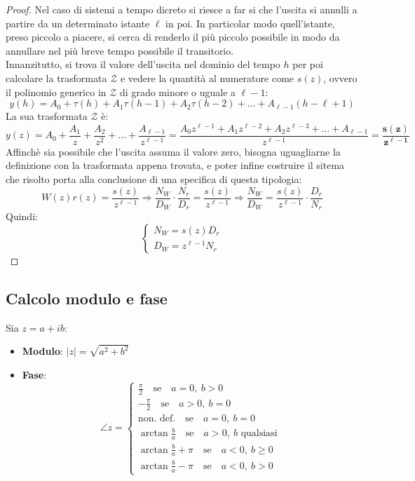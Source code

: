 \documentclass{report}
\theoremstyle{nostyle}
\begin{document}
\begin{proof}
    Nel caso di sistemi a tempo dicreto si riesce a far si che l'uscita si annulli a partire da un determinato istante $\ell$ in poi. In particolar modo quell'istante, preso piccolo a piacere, si cerca di renderlo il più piccolo possibile 
    in modo da annullare nel più breve tempo possibile il transitorio.\smallskip\\
    Innanzitutto, si trova il valore dell'uscita nel dominio del tempo $h$ per poi calcolare la trasformata $\mathcal{Z}$ e vedere la quantità al numeratore come $s(z)$, ovvero il polinomio generico in $\mathcal{Z}$ di grado minore o uguale 
    a $\ell -1$:
    \[        y(h) = A_0 +\tau (h) + A_1 \tau (h-1) + A_2 \tau (h-2)+ \dots + A_{\ell-1} (h -\ell +1)          \]
    La sua trasformata $\mathcal{Z}$ è:
    \[       y(z) = A_0 + \frac{A_1}{z} + \frac{A_2}{z^2} + \dots + \frac{A_{\ell -1}}{z^{\ell -1}}  = \frac{A_0 z^{\ell -1} + A_1 z^{\ell -2} + A_2 z ^{\ell -3}+\dots + A_{\ell -1}}{z^{\ell -1}} = \bm{\frac{s(z)}{z^{\ell -1}}}     \]
    Affinchè sia possibile che l'uscita assuma il valore zero, bisogna uguagliarne la definizione con la trasformata appena trovata, e poter infine costruire il sitema che risolto porta alla conclusione di una specifica di questa tipologia:
    \[        W(z)r(z) = \frac{s(z)}{z^{\ell -1}} \Longrightarrow  \frac{N_W}{D_W} \cdot \frac{N_r}{D_r} =  \frac{s(z)}{z^{\ell -1}} \Longrightarrow \frac{N_W}{D_W} = \frac{s(z)}{z^{\ell -1}} \cdot \frac{D_r}{N_r}     \]
    Quindi:
    \[      \begin{cases}
        N_W = s(z) D_r \\
        D_W = z^{\ell -1} N_r
    \end{cases}       \]
\end{proof}

\subsection{Calcolo modulo e fase}
Sia $z = a + ib$:
\begin{itemize}
    \item \textbf{Modulo}: $|z|=\sqrt{a^2+b^2}$
    \item \textbf{Fase}:
    \[  \angle z=   \begin{cases}
      \displaystyle  \frac{\pi}{2} \quad \text{se} \quad a = 0,\  b>0\\
      \displaystyle -\frac{\pi}{2} \quad \text{se} \quad a >0, \ b = 0\\
      \displaystyle \text{non. def.} \quad \text{se} \quad a = 0,\ b= 0\\
      \displaystyle \arctan{\frac{b}{a}} \quad \text{se} \quad a>0,\ b \text{ qualsiasi}\\
      \displaystyle \arctan{\frac{b}{a}}+\pi \quad \text{se} \quad a<0,\ b\ge 0 \\
      \displaystyle \arctan{\frac{b}{a}} -\pi \quad \text{se} \quad a<0,\ b>0
    \end{cases}         \]
\end{itemize}
\end{document}
